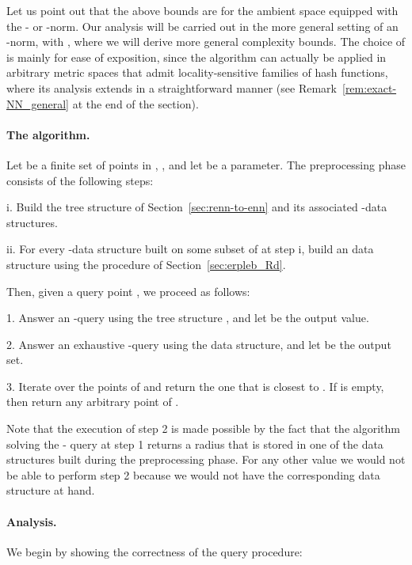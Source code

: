 Let us point out that the above bounds are for the ambient space
 equipped with the - or -norm. Our analysis will
be carried out in the more general setting of an -norm, with
, where we will derive more general complexity bounds.
  The choice of  is mainly for ease of
  exposition, since the algorithm can actually be applied in arbitrary
  metric spaces that admit locality-sensitive families of hash
  functions, where its analysis extends in a straightforward manner
  (see Remark~\ref{rem:exact-NN_general} at the end of the section).


\paragraph{The algorithm.} Let  be a finite set of  points in , , and let  be a parameter. The preprocessing phase
consists of the following steps:
\begin{slist}
\item[i.] Build the tree structure  of
  Section~\ref{sec:renn-to-enn} and its associated -\pleb data
  structures.
\item[ii.] For every -\pleb data structure built on some subset
  of  at step i, build an  data structure using the
  procedure of Section~\ref{sec:erpleb_Rd}.
\end{slist}
Then, given a query point , we proceed as follows:
\begin{slist}
\item[1.] Answer an -\nn query using the tree structure ,
  and let  be the output value.
\item[2.] Answer an exhaustive -\pleb query using the 
  data structure, and let  be the output set.
\item[3.] Iterate over the points of  and return the one that is
  closest to . If  is empty, then return any arbitrary point of .
\end{slist}
Note that the execution of step 2 is
made possible by the fact that the algorithm solving the -\nn
query at step 1 returns a radius  that is stored in one of the
 data structures built during the preprocessing
phase. For any other value  we would not be able to perform step 2
because we would not have the corresponding  data
structure at hand.

\paragraph{Analysis.} We begin by showing the correctness of the 
query procedure:

